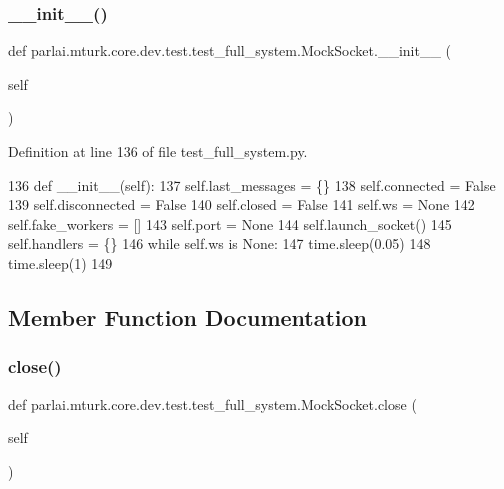 \subsubsection{\texorpdfstring{\+\_\+\+\_\+init\+\_\+\+\_\+()}{\_\_init\_\_()}}
{\footnotesize\ttfamily def parlai.\+mturk.\+core.\+dev.\+test.\+test\+\_\+full\+\_\+system.\+Mock\+Socket.\+\_\+\+\_\+init\+\_\+\+\_\+ (\begin{DoxyParamCaption}\item[{}]{self }\end{DoxyParamCaption})}



Definition at line 136 of file test\+\_\+full\+\_\+system.\+py.


\begin{DoxyCode}
136     \textcolor{keyword}{def }\_\_init\_\_(self):
137         self.last\_messages = \{\}
138         self.connected = \textcolor{keyword}{False}
139         self.disconnected = \textcolor{keyword}{False}
140         self.closed = \textcolor{keyword}{False}
141         self.ws = \textcolor{keywordtype}{None}
142         self.fake\_workers = []
143         self.port = \textcolor{keywordtype}{None}
144         self.launch\_socket()
145         self.handlers = \{\}
146         \textcolor{keywordflow}{while} self.ws \textcolor{keywordflow}{is} \textcolor{keywordtype}{None}:
147             time.sleep(0.05)
148         time.sleep(1)
149 
\end{DoxyCode}


\subsection{Member Function Documentation}
\mbox{\label{classparlai_1_1mturk_1_1core_1_1dev_1_1test_1_1test__full__system_1_1MockSocket_af4078b6c90d1736d84a0c99aa6bc7bc0}} 
\subsubsection{\texorpdfstring{close()}{close()}}
{\footnotesize\ttfamily def parlai.\+mturk.\+core.\+dev.\+test.\+test\+\_\+full\+\_\+system.\+Mock\+Socket.\+close (\begin{DoxyParamCaption}\item[{}]{self }\end{DoxyParamCaption})}



